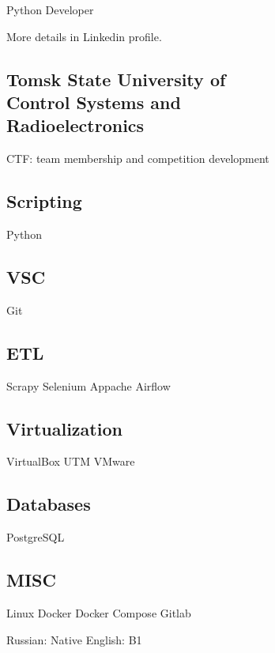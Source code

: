 \documentclass[a4paper]{MagicalCV}
\begin{document}
\lastupdated


\begin{minipage}[t]{0.33\textwidth} 


Python Developer

More details in Linkedin profile.
\sectionsep




\sectionsep


\subsection{Tomsk State University of \\ Control Systems and \\ Radioelectronics}
\vspace{\topsep} %
CTF: team membership and competition development
\sectionsep


\subsection{Scripting}
Python \textbullet{}
\subsection{VSC}
Git \textbullet{}
\subsection{ETL}
Scrapy \textbullet{} Selenium \textbullet{} Appache Airflow \textbullet{}
\subsection{Virtualization}
VirtualBox \textbullet{} UTM \textbullet{} VMware \textbullet{}
\subsection{Databases}
PostgreSQL \textbullet{}
\subsection{MISC}
Linux \textbullet{} Docker \textbullet{} Docker Compose \textbullet{}
Gitlab \textbullet{}



Russian: Native \textbullet{} English: B1
\sectionsep

\end{minipage} 
\end{document}

